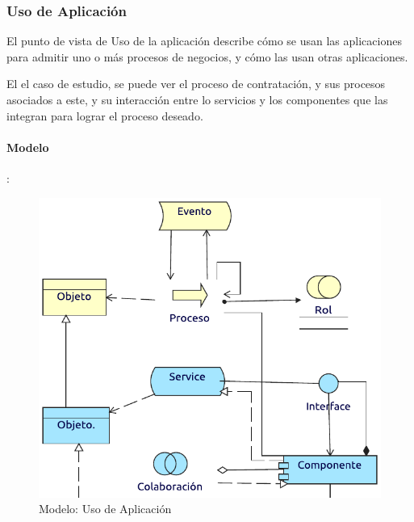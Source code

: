%
%
%
%
%
%
%
%
\newpage

\subsubsection{Uso de Aplicación}

El punto de vista de Uso de la aplicación describe cómo se usan las aplicaciones para admitir uno o más procesos de negocios, y cómo las usan otras aplicaciones. \vspace{\baselineskip}

El el caso de estudio, se puede ver el proceso de contratación, y sus procesos asociados a este, y su interacción entre lo servicios y los componentes que las integran para lograr el proceso deseado.
\paragraph{Modelo}:
\begin{figure}[h!]
	\centering
	\includegraphics[width=0.9\linewidth]{Desarrollo/ArquitecturaEmpresarial/Aplicacion/imgs/uso.pdf}
	\caption{Modelo: Uso de Aplicación}
\end{figure}
\newpage
